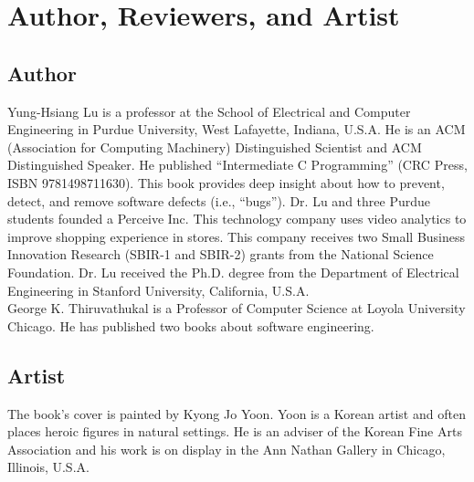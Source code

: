 \chapter*{Author, Reviewers, and Artist}

\section*{Author}

 Yung-Hsiang Lu is a
professor at the School of Electrical and Computer Engineering in
Purdue University, West Lafayette, Indiana, U.S.A.  He is an ACM
(Association for Computing Machinery) Distinguished Scientist and ACM
Distinguished Speaker. He published ``Intermediate C Programming''
(CRC Press, ISBN 9781498711630).  This book provides deep insight
about how to prevent, detect, and remove software defects (i.e.,
``bugs'').  Dr. Lu and three Purdue students founded a Perceive
Inc. This technology company uses video analytics to improve shopping
experience in stores. This company receives two Small Business
Innovation Research (SBIR-1 and SBIR-2) grants from the National
Science Foundation.  Dr. Lu received the Ph.D. degree from the
Department of Electrical Engineering in Stanford University,
California, U.S.A.  \\

George K. Thiruvathukal is a Professor of Computer Science at Loyola
University Chicago.  He has published two books about software
engineering.


\section*{Artist}


The book's cover is painted by Kyong Jo Yoon.  Yoon is a Korean artist
and often places heroic figures in natural settings.  He is an adviser
of the Korean Fine Arts Association and his work is on display in the
Ann Nathan Gallery in Chicago, Illinois, U.S.A.



